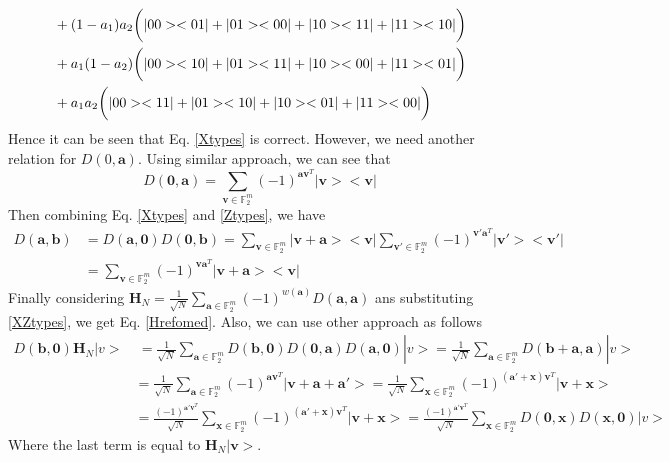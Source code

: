 \documentclass{article}
\begin{document}
{\begin{align*}
	&+ (1-a_1)a_2\bigg{(} |00><01|+|01><00|+|10><11|+|11><10| \bigg{)} \\
	&+a_1(1-a_2)\bigg{(} |00><10|+|01><11|+|10><00|+|11><01| \bigg{)} \\
	&+a_1 a_2 \bigg{(} |00><11|+|01><10|+|10><01|+|11><00| \bigg{)}
\end{align*}
Hence it can be seen that Eq. \eqref{Xtypes} is correct. However, we need another relation for $D\left(0, \mathbf{a}\right)$. Using similar approach, we can see that 
\begin{equation}\label{Ztypes}
	D\left(\mathbf{0},\mathbf{a}\right) = \sum_{\mathbf{v}\in \mathbb{F}_2^m}{ (-1)^{\mathbf{a} \mathbf{v}^T} |\mathbf{v}><\mathbf{v}|}
\end{equation}
Then combining Eq. \eqref{Xtypes} and \eqref{Ztypes}, we have 
\begin{align}\label{XZtypes}
	D\left(\mathbf{a}, \mathbf{b}\right) &= D\left(\mathbf{a}, \mathbf{0}\right) D\left(\mathbf{0}, \mathbf{b}\right) = \sum_{\mathbf{v} \in \mathbb{F}_2^m}{|\mathbf{v+a}><\mathbf{v}|}  \sum_{\mathbf{v}'\in \mathbb{F}_2^m}{ (-1)^{\mathbf{v}' \mathbf{a}^T} |\mathbf{v}'><\mathbf{v}'|} \nonumber \\
	& = \sum_{\mathbf{v} \in \mathbb{F}_2^m}{(-1)^{\mathbf{v} \mathbf{a}^T} |\mathbf{v+a}><\mathbf{v}|}
\end{align}
Finally considering $\mathbf{H}_N = \frac{1}{\sqrt{N}} \sum_{\mathbf{a} \in \mathbb{F}_2^m} (-1)^{w(\mathbf{a})} D\left( \mathbf{a}, \mathbf{a} \right)$ ans substituting \eqref{XZtypes}, we get Eq. \eqref{Hrefomed}.
Also, we can use other approach as follows
\begin{align*}
	D\left(\mathbf{b},\mathbf{0}\right) \mathbf{H}_N |v>& \: = \frac{1}{\sqrt{N}}\sum_{\mathbf{a} \in \mathbb{F}_2^m}{D\left(\mathbf{b},\mathbf{0}\right) D\left(\mathbf{0},\mathbf{a}\right) D\left(\mathbf{a},\mathbf{0}\right)}|v> = \frac{1}{\sqrt{N}}\sum_{\mathbf{a} \in \mathbb{F}_2^m}{D\left(\mathbf{b}+\mathbf{a},\mathbf{a}\right)}|v> \\
	& = \frac{1}{\sqrt{N}}\sum_{\mathbf{a} \in \mathbb{F}_2^m}{(-1)^{\mathbf{a}\mathbf{v}^T} | \mathbf{v}+\mathbf{a}+\mathbf{a}'>}=\frac{1}{\sqrt{N}}\sum_{\mathbf{x} \in \mathbb{F}_2^m}{(-1)^{(\mathbf{a'+x})\mathbf{v}^T} | \mathbf{v}+\mathbf{x}>} \\
	&=\frac{(-1)^{\mathbf{a}'
	 \mathbf{v}^T }}{\sqrt{N}}\sum_{\mathbf{x} \in \mathbb{F}_2^m}{(-1)^{(\mathbf{a'+x})\mathbf{v}^T} | \mathbf{v}+\mathbf{x}>}=\frac{(-1)^{\mathbf{a}'
	 \mathbf{v}^T }}{\sqrt{N}}\sum_{\mathbf{x} \in \mathbb{F}_2^m}{D(\mathbf{0, x}) D(\mathbf{x, 0})}|v>
\end{align*}
Where the last term is equal to $\mathbf{H}_N | \mathbf{v}>$.
}
\\
	
\end{document}
